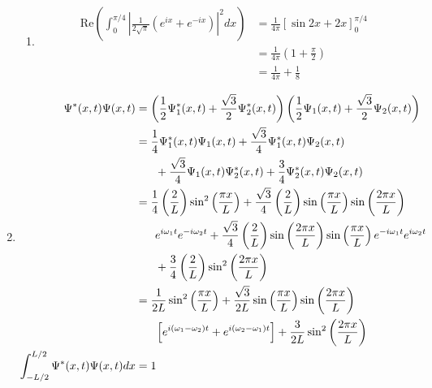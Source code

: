 \documentclass[a4paper,12pt]{article}
\begin{document}
\begin{enumerate}
\begin{enumerate}
            \item
                \begin{align*}
                    \text{Re} \left( \int_0^{\pi / 4} \left| \frac{1}{2 \sqrt{\pi}} \left( e^{ix} + e^{-ix} \right) \right|^2 dx \right)
                    &= \frac{1}{4\pi} \left[ \sin2x + 2x \right]_0^{\pi / 4} \\
                    &= \frac{1}{4\pi} \left( 1 + \frac{\pi}{2} \right) \\
                    &= \frac{1}{4 \pi} + \frac{1}{8}
                \end{align*}
        \end{enumerate}

    \item
        \begin{align*}
            \Psi^*(x, t) \Psi(x, t) &= \left( \frac{1}{2} \Psi_1^*(x, t) + \frac{\sqrt{3}}{2} \Psi_2^*(x, t) \right) \left( \frac{1}{2} \Psi_1(x, t) + \frac{\sqrt{3}}{2} \Psi_2(x, t) \right) \\
            &= \frac{1}{4} \Psi_1^*(x, t) \Psi_1(x, t) + \frac{\sqrt{3}}{4} \Psi_1^*(x, t) \Psi_2(x, t) \\
            & \hspace*{4ex} + \frac{\sqrt{3}}{4} \Psi_1(x, t) \Psi_2^*(x, t) + \frac{3}{4} \Psi_2^*(x, t) \Psi_2(x, t) \\
            &= \frac{1}{4} \left( \frac{2}{L} \right) \sin^2\left( \frac{\pi x}{L} \right) + \frac{\sqrt{3}}{4} \left( \frac{2}{L} \right) \sin\left( \frac{\pi x}{L} \right) \sin\left( \frac{2 \pi x}{L} \right) \\
            & \hspace*{4ex} e^{i \omega_1 t} e^{-i \omega_2 t} + \frac{\sqrt{3}}{4} \left( \frac{2}{L} \right) \sin\left( \frac{2 \pi x}{L} \right) \sin\left( \frac{\pi x}{L} \right) e^{-i \omega_1 t} e^{i \omega_2 t} \\
            & \hspace*{4ex} + \frac{3}{4} \left( \frac{2}{L} \right) \sin^2 \left( \frac{2 \pi x}{L} \right) \\
            &= \frac{1}{2L} \sin^2 \left( \frac{\pi x}{L} \right) + \frac{\sqrt{3}}{2L} \sin\left( \frac{\pi x}{L} \right) \sin\left( \frac{2 \pi x}{L} \right) \\
            & \hspace*{4ex} \left[ e^{i(\omega_1 - \omega_2)t} + e^{i(\omega_2 - \omega_1)t} \right] + \frac{3}{2L} \sin^2 \left( \frac{2 \pi x}{L} \right) \\
            \int_{-L / 2}^{L / 2} \Psi^*(x, t) \Psi(x, t) dx &= 1
        \end{align*}


\end{enumerate}
\end{document}
